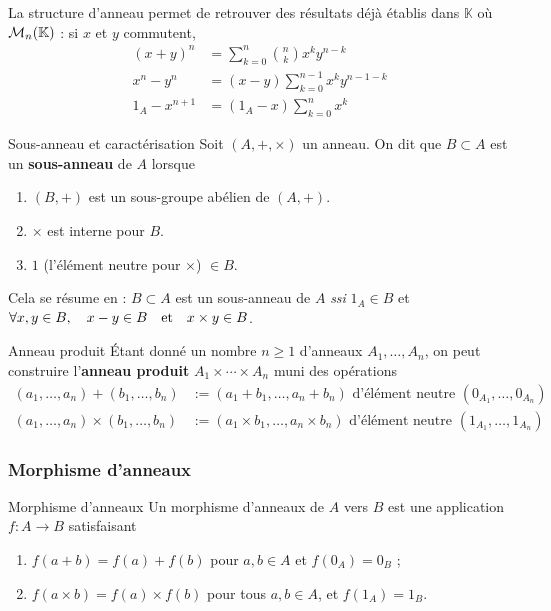     La structure d’anneau permet de retrouver des résultats déjà établis dans $\mathbb{K}$ où $\mathcal{M}_{n}(\mathbb{K})$ : si $x$ et $y$ commutent, 
    \begin{align*}
        (x + y)^n &= \sum_{k=0}^{n} \binom{n}{k} x^k y^{n - k} \\
        x^n - y^n &= (x-y) \sum_{k=0}^{n-1} x^k y^{n-1-k} \\
        1_A - x^{n+1} &= (1_A - x) \sum_{k=0}^{n} x^{k}
    \end{align*}

    \begin{defitheo}{Sous-anneau et caractérisation}{}
        Soit $(A,+,\times)$ un anneau. On dit que $B \subset A$ est un \textbf{sous-anneau} de $A$ lorsque 
        \begin{enumerate}[label=$(h_{\alph*})$]
            \item $(B,+)$ est un sous-groupe abélien de $(A,+)$.
            \item $\times$ est interne pour $B$.
            \item $1$ (l’élément neutre pour $\times$) $\in B$.
        \end{enumerate}
        Cela se résume en : $B \subset A$ est un sous-anneau de $A$ \textit{ssi} $1_A \in B$ et $\forall x,y \in B, \quad x-y \in B \quad \text{et} \quad x \times y \in B$.
    \end{defitheo}

    \begin{defi}{Anneau produit}{}
        Étant donné un nombre $n \geq 1$ d’anneaux $A_1,\ldots,A_n$, on peut construire l’\textbf{anneau produit} $A_1 \times \cdots \times A_n$ muni des opérations 
        \begin{align*}
            (a_1,\ldots, a_n) + (b_1,\ldots,b_n) &:= (a_1 + b_1, \ldots, a_n + b_n) \text{ d’élément neutre } (0_{A_1}, \ldots, 0_{A_n}) \\
            (a_1,\ldots, a_n) \times (b_1,\ldots,b_n) &:= (a_1 \times b_1, \ldots, a_n \times b_n) \text{ d’élément neutre } (1_{A_1}, \ldots, 1_{A_n})
        \end{align*}
    \end{defi}

    \subsubsection{Morphisme d’anneaux}

    \begin{defi}{Morphisme d’anneaux}{}
        Un morphisme d’anneaux de $A$ vers $B$ est une application $f : A \to B$ satisfaisant 
        \begin{enumerate}[label=$(h_{\alph*})$]
            \item $f(a+b) = f(a) + f(b)$ pour $a,b \in A$ et $f(0_A) = 0_B$ ;
            \item $f(a \times b) = f(a) \times f(b)$ pour tous $a,b \in A$, et $f(1_A) = 1_B$.
        \end{enumerate}
    \end{defi}

